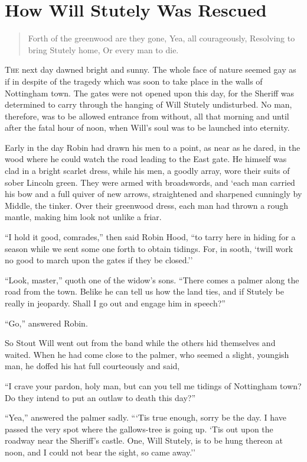 \chapter{How Will Stutely Was Rescued}

\begin{quote}
Forth of the greenwood are they gone,
Yea, all courageously,
Resolving to bring Stutely home,
Or every man to die.
\end{quote}

\lettrine{T}{he} next day dawned bright and sunny. The whole face of nature seemed
gay as if in despite of the tragedy which was soon to take place in the
walls of Nottingham town. The gates were not opened upon this day, for
the Sheriff was determined to carry through the hanging of Will Stutely
undisturbed. No man, therefore, was to be allowed entrance from without,
all that morning and until after the fatal hour of noon, when Will's
soul was to be launched into eternity.

Early in the day Robin had drawn his men to a point, as near as he
dared, in the wood where he could watch the road leading to the East
gate. He himself was clad in a bright scarlet dress, while his men, a
goodly array, wore their suits of sober Lincoln green. They were armed
with broadswords, and `each man carried his bow and a full quiver of new
arrows, straightened and sharpened cunningly by Middle, the tinker. Over
their greenwood dress, each man had thrown a rough mantle, making him
look not unlike a friar.

``I hold it good, comrades,'' then said Robin Hood, ``to tarry here in
hiding for a season while we sent some one forth to obtain tidings. For,
in sooth, `twill work no good to march upon the gates if they be
closed.''

``Look, master,'' quoth one of the widow's sons. ``There comes a palmer
along the road from the town. Belike he can tell us how the land ties,
and if Stutely be really in jeopardy. Shall I go out and engage him in
speech?''

``Go,'' answered Robin.

So Stout Will went out from the band while the others hid themselves and
waited. When he had come close to the palmer, who seemed a slight,
youngish man, he doffed his hat full courteously and said,

``I crave your pardon, holy man, but can you tell me tidings of
Nottingham town? Do they intend to put an outlaw to death this day?''

``Yea,'' answered the palmer sadly. ```Tis true enough, sorry be the
day. I have passed the very spot where the gallows-tree is going up.
`Tis out upon the roadway near the Sheriff's castle. One, Will Stutely,
is to be hung thereon at noon, and I could not bear the sight, so came
away.''

